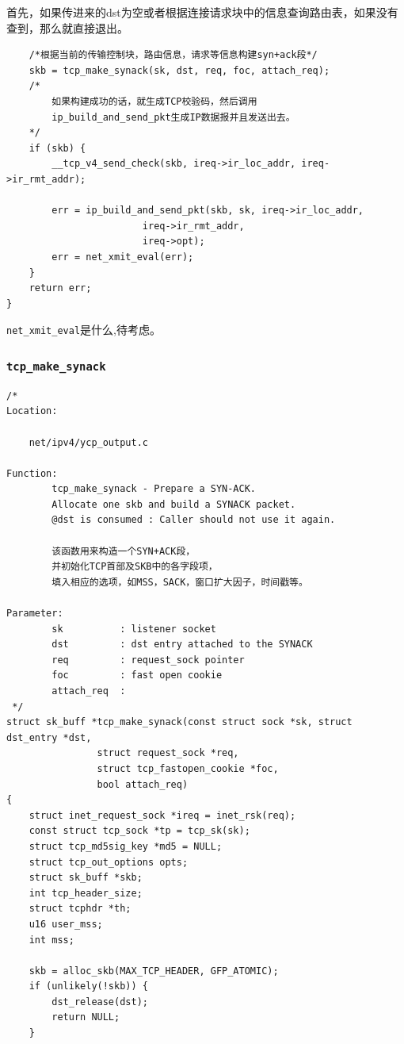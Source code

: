 	首先，如果传进来的dst为空或者根据连接请求块中的信息查询路由表，如果没有查到，那么就直接退出。		

\begin{verbatim}
	/*根据当前的传输控制块，路由信息，请求等信息构建syn+ack段*/
    skb = tcp_make_synack(sk, dst, req, foc, attach_req);
	/*
		如果构建成功的话，就生成TCP校验码，然后调用
		ip_build_and_send_pkt生成IP数据报并且发送出去。
	*/
    if (skb) {
        __tcp_v4_send_check(skb, ireq->ir_loc_addr, ireq->ir_rmt_addr);

        err = ip_build_and_send_pkt(skb, sk, ireq->ir_loc_addr,
                        ireq->ir_rmt_addr,
                        ireq->opt);
        err = net_xmit_eval(err);
    }
    return err;
}
\end{verbatim}
                \texttt{net_xmit_eval}是什么,待考虑。
            \subsubsection{\texttt{tcp_make_synack}}
				\label{ServerSendSYN+ACK:tcp_make_synack}

\begin{verbatim}
/*
Location:

	net/ipv4/ycp_output.c

Function:
        tcp_make_synack - Prepare a SYN-ACK.
        Allocate one skb and build a SYNACK packet.
        @dst is consumed : Caller should not use it again.

		该函数用来构造一个SYN+ACK段，
		并初始化TCP首部及SKB中的各字段项，
		填入相应的选项，如MSS，SACK，窗口扩大因子，时间戳等。

Parameter:
        sk          : listener socket
        dst         : dst entry attached to the SYNACK
        req         : request_sock pointer
        foc         : fast open cookie
        attach_req  :
 */
struct sk_buff *tcp_make_synack(const struct sock *sk, struct dst_entry *dst,
                struct request_sock *req,
                struct tcp_fastopen_cookie *foc,
                bool attach_req)
{
    struct inet_request_sock *ireq = inet_rsk(req);
    const struct tcp_sock *tp = tcp_sk(sk);
    struct tcp_md5sig_key *md5 = NULL;
    struct tcp_out_options opts;
    struct sk_buff *skb;
    int tcp_header_size;
    struct tcphdr *th;
    u16 user_mss;
    int mss;

    skb = alloc_skb(MAX_TCP_HEADER, GFP_ATOMIC);
    if (unlikely(!skb)) {
        dst_release(dst);
        return NULL;
    }
\end{verbatim}

